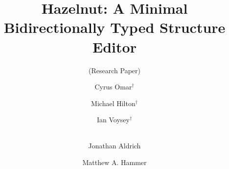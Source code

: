 \documentclass{llncs}
\begin{document}
%
\frontmatter          %

\mainmatter              %
%
\title{Hazelnut: A Minimal Bidirectionally Typed Structure Editor}
\subtitle{(Research Paper)}
%
%
\author{Cyrus Omar$^\dagger$ \and Michael Hilton$^\dagger$ \and
Ian Voysey$^\dagger$ \and \\Jonathan Aldrich \and Matthew A. Hammer}
%
%
%
\end{document}
